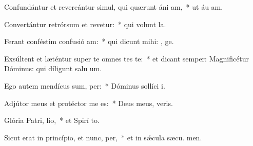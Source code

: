 \item Confundántur et revereántur simul, qui quærunt áni am,~* ut áu am.
\item Convertántur retrórsum et revetur:~* qui volunt  la.
\item Ferant conféstim confusió am:~* qui dicunt mihi: , ge.
\item Exsúltent et læténtur super te omnes tes te:~* et dicant semper: Magnificétur Dóminus: qui díligunt salu um.
\item Ego autem mendícus sum,  per:~* Dóminus sollíci  i.
\item Adjútor meus et protéctor me  es:~* Deus meus,  veris.
\item Glória Patri,  lio,~* et Spirí to.
\item Sicut erat in princípio, et nunc,  per,~* et in sǽcula sæcu. men.
